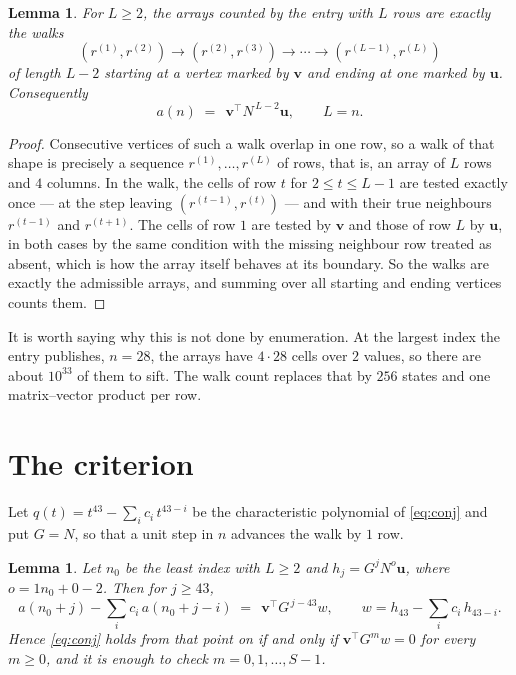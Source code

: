 \documentclass[11pt,a4paper]{article}
\theoremstyle{plain}
\newtheorem{lemma}[theorem]{Lemma}
\theoremstyle{definition}
\begin{document}
\begin{lemma}\label{lem:walk}
For $L\ge2$, the arrays counted by the entry with $L$ rows are exactly the walks
\[
(r^{(1)},r^{(2)})\to(r^{(2)},r^{(3)})\to\cdots\to(r^{(L-1)},r^{(L)})
\]
of length $L-2$ starting at a vertex marked by $\mathbf{v}$ and ending at one marked by
$\mathbf{u}$. Consequently
\[
a(n)\;=\;\,\mathbf{v}^{\!\top}N^{\,L-2}\mathbf{u},\qquad L=n .
\]
\end{lemma}

\begin{proof}
Consecutive vertices of such a walk overlap in one row, so a walk of that shape is
precisely a sequence $r^{(1)},\dots,r^{(L)}$ of rows, that is, an array of $L$ rows
and $4$ columns. In the walk, the cells of row $t$ for $2\le t\le L-1$ are tested
exactly once --- at the step leaving $(r^{(t-1)},r^{(t)})$ --- and with their true
neighbours $r^{(t-1)}$ and $r^{(t+1)}$. The cells of row $1$ are tested by
$\mathbf{v}$ and those of row $L$ by $\mathbf{u}$, in both cases by the same condition
with the missing neighbour row treated as absent, which is how the array itself behaves at
its boundary. So the walks are exactly the admissible arrays, and summing over all starting
and ending vertices counts them.
\end{proof}


It is worth saying why this is not done by enumeration. At the largest index the entry
publishes, $n=28$, the arrays have $4\cdot28$ cells over
$2$ values, so there are about $10^{33}$ of them to sift. The
walk count replaces that by $256$ states and one matrix--vector product per row.
\section{The criterion}

Let $q(t)=t^{43}-\sum_i c_i\,t^{43-i}$ be the characteristic polynomial of
\eqref{eq:conj} and put $G=N$, so that a unit step in $n$ advances the walk by
$1$ row.

\begin{lemma}\label{lem:crit}
Let $n_0$ be the least index with $L\ge2$ and $h_j=G^{j}N^{o}\mathbf{u}$, where
$o=1n_0+0-2$. Then for $j\ge43$,
\[
a(n_0+j)-\sum_i c_i\,a(n_0+j-i)\;=\;\,\mathbf{v}^{\!\top}G^{\,j-43}w,
\qquad w=h_{43}-\sum_i c_i\,h_{43-i} .
\]
Hence \eqref{eq:conj} holds from that point on if and only if
$\mathbf{v}^{\!\top}G^{m}w=0$ for every $m\ge0$, and it is enough to check
$m=0,1,\dots,S-1$.
\end{lemma}
\end{document}
